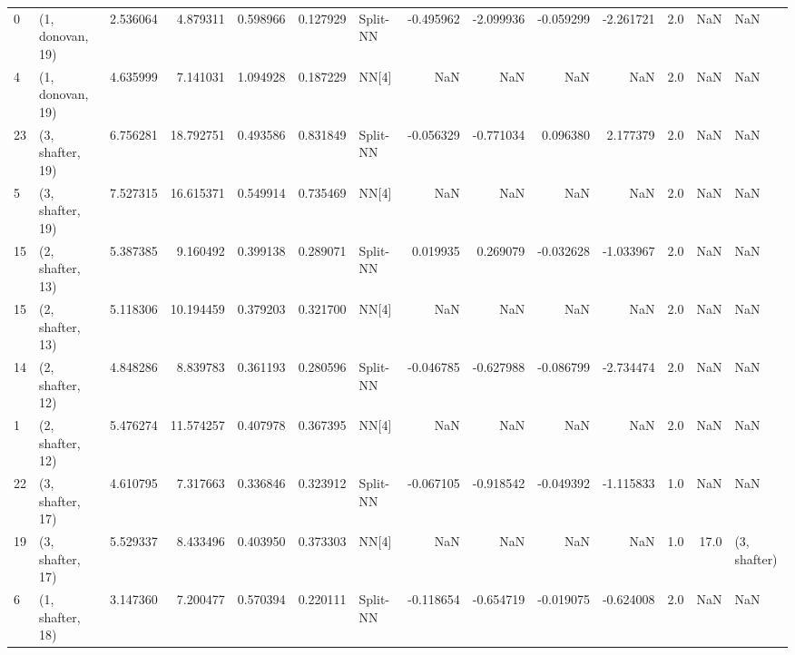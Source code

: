 \begin{tabular}{llrrrrlrrrrrrl}
0  &  (1, donovan, 19) &   2.536064 &   4.879311 &   0.598966 &  0.127929 &    Split-NN &       -0.495962 &     -2.099936 &      -0.059299 &    -2.261721 &            2.0 &    NaN &              NaN \\
4  &  (1, donovan, 19) &   4.635999 &   7.141031 &   1.094928 &  0.187229 &       NN[4] &             NaN &           NaN &            NaN &          NaN &            2.0 &    NaN &              NaN \\
23 &  (3, shafter, 19) &   6.756281 &  18.792751 &   0.493586 &  0.831849 &    Split-NN &       -0.056329 &     -0.771034 &       0.096380 &     2.177379 &            2.0 &    NaN &              NaN \\
5  &  (3, shafter, 19) &   7.527315 &  16.615371 &   0.549914 &  0.735469 &       NN[4] &             NaN &           NaN &            NaN &          NaN &            2.0 &    NaN &              NaN \\
15 &  (2, shafter, 13) &   5.387385 &   9.160492 &   0.399138 &  0.289071 &    Split-NN &        0.019935 &      0.269079 &      -0.032628 &    -1.033967 &            2.0 &    NaN &              NaN \\
15 &  (2, shafter, 13) &   5.118306 &  10.194459 &   0.379203 &  0.321700 &       NN[4] &             NaN &           NaN &            NaN &          NaN &            2.0 &    NaN &              NaN \\
14 &  (2, shafter, 12) &   4.848286 &   8.839783 &   0.361193 &  0.280596 &    Split-NN &       -0.046785 &     -0.627988 &      -0.086799 &    -2.734474 &            2.0 &    NaN &              NaN \\
1  &  (2, shafter, 12) &   5.476274 &  11.574257 &   0.407978 &  0.367395 &       NN[4] &             NaN &           NaN &            NaN &          NaN &            2.0 &    NaN &              NaN \\
22 &  (3, shafter, 17) &   4.610795 &   7.317663 &   0.336846 &  0.323912 &    Split-NN &       -0.067105 &     -0.918542 &      -0.049392 &    -1.115833 &            1.0 &    NaN &              NaN \\
19 &  (3, shafter, 17) &   5.529337 &   8.433496 &   0.403950 &  0.373303 &       NN[4] &             NaN &           NaN &            NaN &          NaN &            1.0 &   17.0 &     (3, shafter) \\
6  &  (1, shafter, 18) &   3.147360 &   7.200477 &   0.570394 &  0.220111 &    Split-NN &       -0.118654 &     -0.654719 &      -0.019075 &    -0.624008 &            2.0 &    NaN &              NaN \\

\end{tabular}
